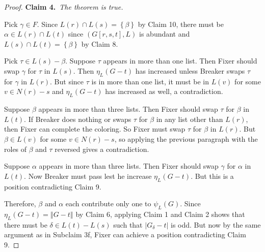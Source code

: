 \documentclass[12pt]{article}
\theoremstyle{plain}
\theoremstyle{definition}
\theoremstyle{remark}
\newcommand{\set}[1]{\left\{ #1 \right\}}
\newcommand{\card}[1]{\left|#1\right|}
\newcommand{\size}[1]{\left\Vert#1\right\Vert}
\newcommand{\claim}[2]{{\bf Claim #1.}~{\it #2}~~}
\begin{document}
\begin{proof}
		\claim{4}{The theorem is true.}
		
			Pick $\gamma \in F$.  Since $L(r) \cap L(s) = \set{\beta}$ by Claim 10, there must be $\alpha \in L(r) \cap L(t)$ since $(G[r,s,t],L)$ is abundant and $L(s) \cap L(t) = \set{\beta}$ by Claim 8.
			
			Pick $\tau \in L(s) - \beta$.  Suppose $\tau$ appears in more than one list.  Then Fixer should swap $\gamma$ for $\tau$ in $L(s)$.  Then $\eta_L(G - t)$ has increased unless Breaker swaps $\tau$ for $\gamma$ in $L(r)$.  But since $\tau$ is in more than one list, it must be in $L(v)$ for some $v \in N(r) - s$ and $\eta_L(G - t)$ has increased as well, a contradiction.
			
			Suppose $\beta$ appears in more than three lists.  Then Fixer should swap $\tau$ for $\beta$ in $L(t)$.  If Breaker does nothing or swaps $\tau$ for $\beta$ in any list other than $L(r)$, then Fixer can complete the coloring.  So Fixer must swap $\tau$ for $\beta$ in $L(r)$.  But $\beta \in L(v)$ for some $v \in N(r) - s$, so applying the previous paragraph with the roles of $\beta$ and $\tau$ reversed gives a contradiction.
			
			Suppose $\alpha$ appears in more than three lists.  Then Fixer should swap $\gamma$ for $\alpha$ in $L(t)$. Now Breaker must pass lest he increase $\eta_L(G - t)$.  But this is a position contradicting Claim 9.
			
			Therefore, $\beta$ and $\alpha$ each contribute only one to $\psi_L(G)$. Since $\eta_L(G-t) = \size{G-t}$ by Claim 6, applying Claim 1 and Claim 2 shows that there must be $\delta \in L(t) - L(s)$ such that $\card{G_\delta - t}$ is odd.  But now by the same argument as in Subclaim 3f, Fixer can achieve a position contradicting Claim 9.
	\end{proof}



\end{document}
